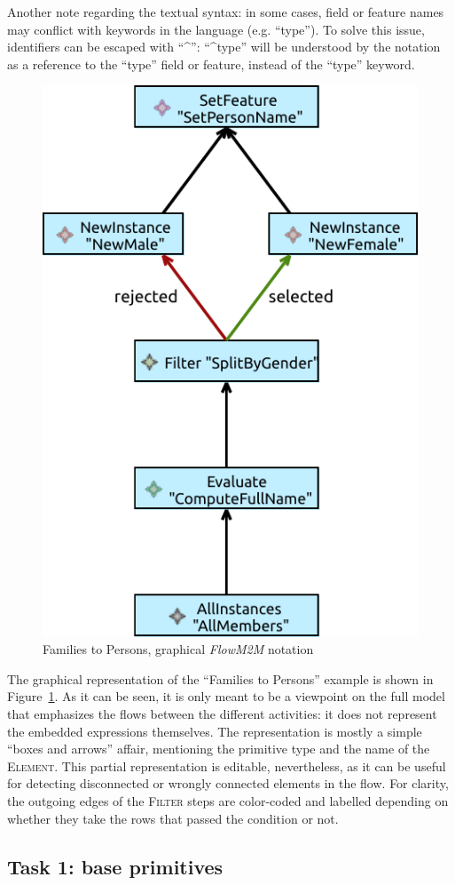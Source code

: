 \documentclass[a4paper]{scrartcl}
\newcommand*{\class}[1]{\textsc{#1}}
\newcommand{\FlowMM}{\emph{FlowM2M}\xspace}
\begin{document}
Another note regarding the textual syntax: in some cases, field or
feature names may conflict with keywords in the language
(e.g. ``type''). To solve this issue, identifiers can be escaped with
``\^{}'': ``\^{}type'' will be understood by the notation as a reference to
the ``type'' field or feature, instead of the ``type'' keyword.

\begin{figure}
  \centering
  \includegraphics[width=.4\textwidth]{families2persons}
  \caption{Families to Persons, graphical \FlowMM notation}
  \label{fig:f2p}
\end{figure}

The graphical representation of the ``Families to Persons'' example is
shown in Figure~\ref{fig:f2p}. As it can be seen, it is only meant to
be a viewpoint on the full model that emphasizes the flows between the
different activities: it does not represent the embedded expressions
themselves. The representation is mostly a simple ``boxes and arrows''
affair, mentioning the primitive type and the name of the
\class{Element}. This partial representation is editable,
nevertheless, as it can be useful for detecting disconnected or
wrongly connected elements in the flow. For clarity, the outgoing
edges of the \class{Filter} steps are color-coded and labelled
depending on whether they take the rows that passed the condition or
not.

\subsection{Task 1: base primitives}
\label{sec:baseprim}

\end{document}
